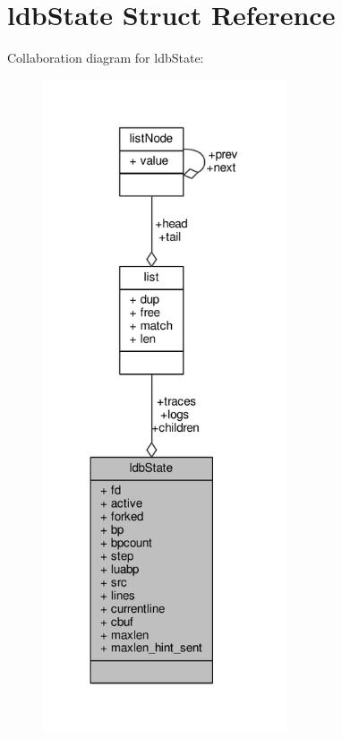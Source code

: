 \hypertarget{structldbState}{}\section{ldb\+State Struct Reference}
\label{structldbState}


Collaboration diagram for ldb\+State\+:\nopagebreak
\begin{figure}[H]
\begin{center}
\leavevmode
\includegraphics[width=204pt]{structldbState__coll__graph}
\end{center}
\end{figure}
